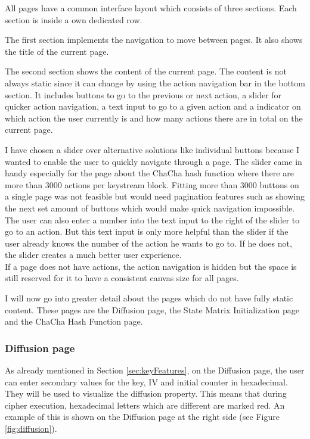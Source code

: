 All pages have a common interface layout which consists of three sections. Each section is inside a own dedicated row.

The first section implements the navigation to move between pages. It also shows the title of the current page.

The second section shows the content of the current page. The content is not always static since it can change by using the action navigation bar in the bottom section. It includes buttons to go to the previous or next action, a slider for quicker action navigation, a text input to go to a given action and a indicator on which action the user currently is and how many actions there are in total on the current page.

I have chosen a slider over alternative solutions like individual buttons because I wanted to enable the user to quickly navigate through a page. The slider came in handy especially for the page about the ChaCha hash function where there are more than 3000 actions per keystream block. Fitting more than 3000 buttons on a single page was not feasible but would need pagination features such as showing the next set amount of buttons which would make quick navigation impossible. \\
The user can also enter a  number into the text input to the right of the slider to go to an action. But this text input is only more helpful than the slider if the user already knows the number of the action he wants to go to. If he does not, the slider creates a much better user experience. \\
If a page does not have actions, the action navigation is hidden but the space is still reserved for it to have a consistent canvas size for all pages.

I will now go into greater detail about the pages which do not have fully static content. These pages are the Diffusion page, the State Matrix Initialization page and the ChaCha Hash Function page.

\subsubsection{Diffusion page}

As already mentioned in Section \ref{sec:keyFeatures}, on the Diffusion page, the user can enter secondary values for the key, IV and initial counter in hexadecimal. They will be used to visualize the diffusion property. This means that during cipher execution, hexadecimal letters which are different are marked red. An example of this is shown on the Diffusion page at the right side (see Figure \ref{fig:diffusion}).

